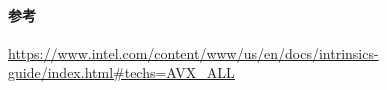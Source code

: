 \paragraph{参考}

\url{https://www.intel.com/content/www/us/en/docs/intrinsics-guide/index.html#techs=AVX_ALL}
